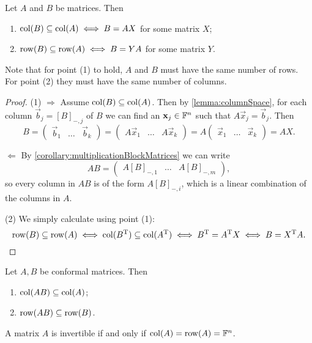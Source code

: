 \begin{proposition} \label{prop:rowColSubspaces}
Let $A$ and $B$ be matrices. Then
\begin{enumerate}
\item $\operatorname{col}(B)\subseteq \operatorname{col}(A) \iff B = AX$ for some matrix $X$;
\item $\operatorname{row}(B)\subseteq \operatorname{row}(A) \iff B = YA$ for some matrix $Y$.
\end{enumerate}
\end{proposition}
Note that for point (1) to hold, $A$ and $B$ must have the same number of rows. For point (2) they must have the same number of columns.
\begin{proof}
(1) $\boxed{\Rightarrow}$ Assume $\operatorname{col}(B)\subseteq \operatorname{col}(A)$. Then   by \ref{lemma:columnSpace}, for each column $\vec{b}_j = [B]_{-,j}$ of $B$ we can find an $\bm{\mathrm{x}}_j\in \mathbb{F}^n$ such that $A\vec{x}_j = \vec{b}_j$. Then
\[ B = \begin{pmatrix}
\vec{b}_1 & \hdots & \vec{b}_k
\end{pmatrix} = \begin{pmatrix}
A\vec{x}_1 & \hdots & A\vec{x}_k
\end{pmatrix} = A \begin{pmatrix}
\vec{x}_1 & \hdots & \vec{x}_k
\end{pmatrix} = AX.\]

$\boxed{\Leftarrow}$ By \ref{corollary:multiplicationBlockMatrices} we can write
\[ AB = \begin{pmatrix}
A[B]_{-,1} & \hdots & A[B]_{-,m}
\end{pmatrix}, \]
so every column in $AB$ is of the form $A[B]_{-,i}$, which is a linear combination of the columns in $A$.

(2) We simply calculate using point (1):
\[ \operatorname{row}(B)\subseteq \operatorname{row}(A) \iff \operatorname{col}(B^{\mathrm{T}})\subseteq \operatorname{col}(A^{\mathrm{T}}) \iff B^{\mathrm{T}} = A^{\mathrm{T}} X \iff B = X^{\mathrm{T}} A. \]
\end{proof}
\begin{corollary} \label{corollary:RowColSpaceProduct}
Let $A,B$ be conformal matrices. Then
\begin{enumerate}
\item $\operatorname{col}(AB)\subseteq \operatorname{col}(A)$;
\item $\operatorname{row}(AB)\subseteq \operatorname{row}(B)$.
\end{enumerate}
\end{corollary}
\begin{corollary} \label{corollary:RowColSpaceInverse}
A matrix $A$ is invertible \textup{if and only if} $\operatorname{col}(A) = \operatorname{row}(A) = \mathbb{F}^n$.
\end{corollary}
